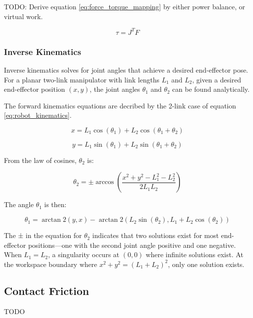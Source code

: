     TODO: Derive equation \ref{eq:force_torque_mapping} by either power balance, or virtual work. 

    \begin{equation}
        \label{eq:force_torque_mapping}
        \tau = J^T F
    \end{equation}

    \subsubsection{Inverse Kinematics}
    Inverse kinematics solves for joint angles that achieve a desired end-effector pose. For a planar two-link manipulator with link lengths \(L_1\) and \(L_2\), given a desired end-effector position \((x,y)\), the joint angles \(\theta_1\) and \(\theta_2\) can be found analytically.

    The forward kinematics equations are decribed by the 2-link case of equation \ref{eq:robot_kinematics}.
    
    \begin{equation}
    x = L_1 \cos(\theta_1) + L_2 \cos(\theta_1 + \theta_2)
    \end{equation}
    
    \begin{equation}
    y = L_1 \sin(\theta_1) + L_2 \sin(\theta_1 + \theta_2)
    \end{equation}
    
    From the law of cosines, \(\theta_2\) is:
    
    \begin{equation}
    \theta_2 = \pm \arccos\left(\frac{x^2 + y^2 - L_1^2 - L_2^2}{2L_1L_2}\right)
    \end{equation}
    
    The angle \(\theta_1\) is then:
    
    \begin{equation}
    \theta_1 = \arctan2(y,x) - \arctan2(L_2\sin(\theta_2), L_1 + L_2\cos(\theta_2))
    \end{equation}
    
    The ± in the equation for \(\theta_2\) indicates that two solutions exist for most end-effector positions—one with the second joint angle positive and one negative. When \(L_1 = L_2\), a singularity occurs at \((0,0)\) where infinite solutions exist. At the workspace boundary where \(x^2 + y^2 = (L_1 + L_2)^2\), only one solution exists.



\subsection{Contact Friction}
\label{sec:contact_friction}
TODO

